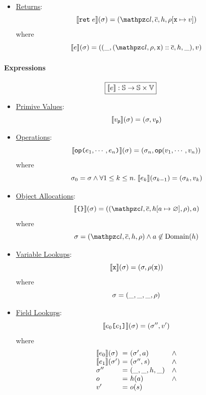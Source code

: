 \begin{itemize}
  \item \underline{Returns}:
    \[
      \sem{\kwret \; \expr}(\st) = (\lab, \ctxts, \heap, \env[\varx \mapsto
      \val])
    \]
    where
    \[
      \sem{\expr}(\st) = ((\_, (\lab, \env, \varx) :: \ctxts, \heap, \_), \val)
    \]
\end{itemize}

\paragraph{Expressions}
\[
  \framebox{$\sem{\expr}: \stset \rightarrow \stset \times \valset$}
\]
\begin{itemize}
  \item \underline{Primive Values}:
    \[
      \llbracket{v_{\textsf{p}}}\rrbracket(\sigma) =
      (\sigma, v_{\textsf{p}})
    \]

  \item \underline{Operations}:
    \[
      \llbracket{\textsf{op}\texttt{(}e_1, \cdots, e_n \texttt{)}}\rrbracket(\sigma) =
      (\sigma_n, \textsf{op}(v_1, \cdots, v_n))
    \]
    where
    \[
      \sigma_0 = \sigma \wedge
      \forall 1 \leq k \leq n. \; \llbracket{e_k}\rrbracket(\sigma_{k-1}) = (\sigma_k, v_k)
    \]

  \item \underline{Object Allocations}:
    \[
      \sem{\kwcl \kwcr}(\st) =
      ((\lab, \ctxts, \heap[\addr \mapsto \varnothing], \env), \addr)
    \]
    where
    \[
      \st = (\lab, \ctxts, \heap, \env) \wedge
      \addr \not\in \text{Domain}(\heap)
    \]

  \item \underline{Variable Lookups}:
    \[
      \llbracket{\texttt{x}}\rrbracket(\sigma) =
      (\sigma, \rho(\texttt{x}))
    \]
    where
    \[
      \sigma = (\_, \_, \_, \rho)
    \]

  \item \underline{Field Lookups}:
    \[
      \llbracket{e_0 \texttt{[}e_1 \texttt{]}}\rrbracket(\sigma) =
      (\sigma'', v')
    \]
    where
    \[
      \begin{array}{l@{~}c@{~}ll}
        \sem{\expr_0}(\st) &=& (\st', \addr) &\wedge\\
        \sem{\expr_1}(\st') &=& (\st'', \str) &\wedge\\
        \st'' &=& (\_, \_, \heap, \_) &\wedge\\
        \obj &=& \heap(\addr) &\wedge\\
        \val' &=& \obj(\str)\\
      \end{array}
    \]
\end{itemize}





